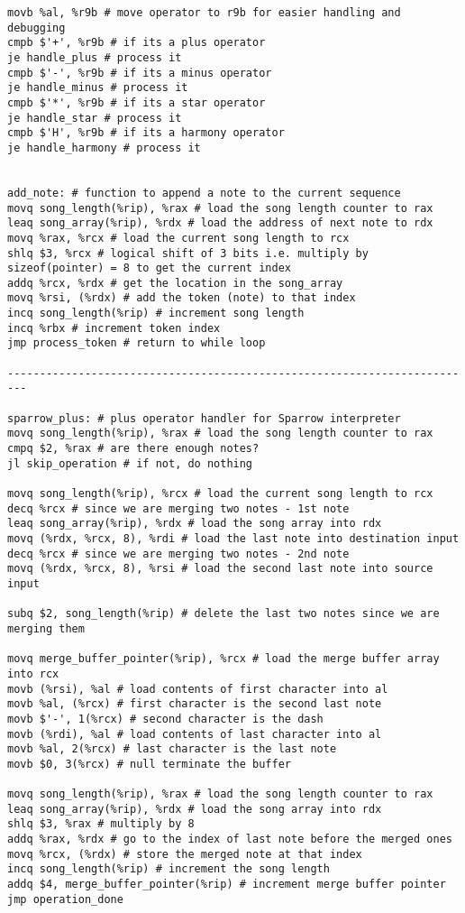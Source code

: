 \documentclass[a4paper,12pt]{article}
\begin{document}
\begin{lstlisting}[style=ATnTStyle]
movb %al, %r9b # move operator to r9b for easier handling and debugging
cmpb $'+', %r9b # if its a plus operator
je handle_plus # process it
cmpb $'-', %r9b # if its a minus operator
je handle_minus # process it
cmpb $'*', %r9b # if its a star operator
je handle_star # process it
cmpb $'H', %r9b # if its a harmony operator
je handle_harmony # process it


add_note: # function to append a note to the current sequence
movq song_length(%rip), %rax # load the song length counter to rax
leaq song_array(%rip), %rdx # load the address of next note to rdx
movq %rax, %rcx # load the current song length to rcx
shlq $3, %rcx # logical shift of 3 bits i.e. multiply by sizeof(pointer) = 8 to get the current index
addq %rcx, %rdx # get the location in the song_array
movq %rsi, (%rdx) # add the token (note) to that index
incq song_length(%rip) # increment song length
incq %rbx # increment token index
jmp process_token # return to while loop

-------------------------------------------------------------------------

sparrow_plus: # plus operator handler for Sparrow interpreter
movq song_length(%rip), %rax # load the song length counter to rax
cmpq $2, %rax # are there enough notes?
jl skip_operation # if not, do nothing

movq song_length(%rip), %rcx # load the current song length to rcx
decq %rcx # since we are merging two notes - 1st note
leaq song_array(%rip), %rdx # load the song array into rdx
movq (%rdx, %rcx, 8), %rdi # load the last note into destination input
decq %rcx # since we are merging two notes - 2nd note
movq (%rdx, %rcx, 8), %rsi # load the second last note into source input

subq $2, song_length(%rip) # delete the last two notes since we are merging them

movq merge_buffer_pointer(%rip), %rcx # load the merge buffer array into rcx
movb (%rsi), %al # load contents of first character into al
movb %al, (%rcx) # first character is the second last note
movb $'-', 1(%rcx) # second character is the dash
movb (%rdi), %al # load contents of last character into al
movb %al, 2(%rcx) # last character is the last note
movb $0, 3(%rcx) # null terminate the buffer

movq song_length(%rip), %rax # load the song length counter to rax
leaq song_array(%rip), %rdx # load the song array into rdx
shlq $3, %rax # multiply by 8
addq %rax, %rdx # go to the index of last note before the merged ones
movq %rcx, (%rdx) # store the merged note at that index
incq song_length(%rip) # increment the song length
addq $4, merge_buffer_pointer(%rip) # increment merge buffer pointer
jmp operation_done


\end{lstlisting}
\end{document}
